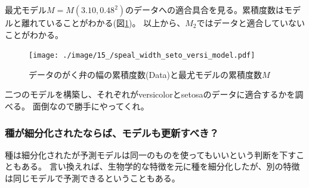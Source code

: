最尤モデル$M=M(3.10,0.48^2)$のデータへの適合具合を見る。累積度数はモデルと離れていることがわかる(図\ref{fig:speal_width_setosa_versi_model})。
以上から、$M_2$ではデータと適合していないことがわかる。


\begin{figure}
    \begin{center}
        \texttt{[image: ./image/15\_/speal\_width\_seto\_versi\_model.pdf]}
        \caption{データのがく弁の幅の累積度数(Data)と最尤モデルの累積度数$M$}
        \label{fig:speal_width_setosa_versi_model}
    \end{center}
\end{figure}


二つのモデルを構築し、それぞれがversicolorとsetosaのデータに適合するかを調べる。
面倒なので勝手にやってくれ。


\subsubsection{種が細分化されたならば、モデルも更新すべき？}
種は細分化されたが予測モデルは同一のものを使ってもいいという判断を下すこともある。
言い換えれば、生物学的な特徴を元に種を細分化したが、別の特徴は同じモデルで予測できるということもある。


